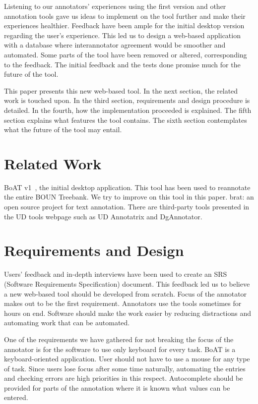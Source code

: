 \documentclass[
]{ceurart}
\begin{document}
Listening to our annotators' experiences using the first version and other annotation tools gave us ideas to implement on the tool further and make their experiences healthier.
Feedback have been ample for the initial desktop version regarding the user's experience.
This led us to design a web-based application with a database where interannotator agreement would be smoother and automated.
Some parts of the tool have been removed or altered, corresponding to the feedback.
The initial feedback and the tests done promise much for the future of the tool.

This paper presents this new web-based tool.
In the next section, the related work is touched upon.
In the third section, requirements and design procedure is detailed.
In the fourth, how the implementation proceeded is explained.
The fifth section explains what features the tool contains.
The sixth section contemplates what the future of the tool may entail.

\section{Related Work}

BoAT v1~\cite{turk-etal-2019-turkish}, the initial desktop application. 
This tool has been used to reannotate the entire BOUN Treebank.
We try to improve on this tool in this paper.\newline
brat: an open source project for text annotation.\cite{brat}\newline
There are third-party tools presented in the UD tools webpage such as UD Annotatrix\cite{tyers-etal:2018} and DgAnnotator\cite{dgannotator}.

\section{Requirements and Design}

Users' feedback and in-depth interviews have been used to create an SRS (Software Requirements Specification) document.
This feedback led us to believe a new web-based tool should be developed from scratch.
Focus of the annotator makes out to be the first requirement.
Annotators use the tools sometimes for hours on end.
Software should make the work easier by reducing distractions and automating work that can be automated.

One of the requirements we have gathered for not breaking the focus of the annotator is for the software to use only keyboard for every task.
BoAT is a keyboard-oriented application.
User should not have to use a mouse for any type of task.
Since users lose focus after some time naturally, automating the entries and checking errors are high priorities in this respect.
Autocomplete should be provided for parts of the annotation where it is known what values can be entered.
\end{document}
